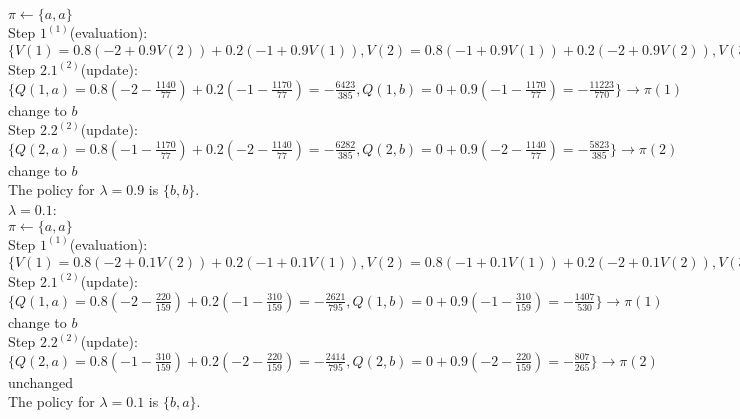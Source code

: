 \documentclass[11pt]{article}
\begin{document}
\begin{onehalfspace}
\begin{itemize}
$\pi \leftarrow \{a, a\}$\\
Step $1^{(1)}$(evaluation): $\{V(1) = 0.8(-2+0.9V(2)) + 0.2(-1+0.9V(1)), V(2) = 0.8(-1+0.9V(1))+0.2(-2+0.9V(2)), V(3) = 0\} \rightarrow \{V(1) = -\frac{1170}{77}, V(2) = -\frac{1140}{77}\}$\\
Step $2.1^{(2)}$(update): $\{Q(1, a) = 0.8(-2 - \frac{1140}{77}) + 0.2(-1 - \frac{1170}{77}) = -\frac{6423}{385}, Q(1,b) = 0 + 0.9(-1-\frac{1170}{77}) = -\frac{11223}{770}\} \rightarrow \pi(1)$ change to $b$\\
Step $2.2^{(2)}$(update): $\{Q(2, a) = 0.8(-1 - \frac{1170}{77}) + 0.2(-2 - \frac{1140}{77}) = -\frac{6282}{385}, Q(2, b) = 0 + 0.9(-2-\frac{1140}{77})=-\frac{5823}{385}\} \rightarrow \pi(2)$ change to $b$\\
The policy for $\lambda = 0.9$ is $\{b,b\}$.
\\
$\lambda = 0.1$:\\
$\pi \leftarrow \{a, a\}$\\
Step $1^{(1)}$(evaluation): $\{V(1) = 0.8(-2+0.1V(2)) + 0.2(-1+0.1V(1)), V(2) = 0.8(-1+0.1V(1))+0.2(-2+0.1V(2)), V(3) = 0\} \rightarrow \{V(1) = -\frac{310}{159}, V(2) = -\frac{220}{159}\}$\\
Step $2.1^{(2)}$(update): $\{Q(1, a) = 0.8(-2 - \frac{220}{159}) + 0.2(-1 - \frac{310}{159}) = -\frac{2621}{795}, Q(1,b) = 0 + 0.9(-1-\frac{310}{159}) = -\frac{1407}{530}\} \rightarrow \pi(1)$ change to $b$\\
Step $2.2^{(2)}$(update): $\{Q(2, a) = 0.8(-1 - \frac{310}{159}) + 0.2(-2 - \frac{220}{159}) = -\frac{2414}{795}, Q(2, b) = 0 + 0.9(-2-\frac{220}{159})=-\frac{807}{265}\} \rightarrow \pi(2)$ unchanged\\
The policy for $\lambda = 0.1$ is $\{b,a\}$.
\end{itemize}
\end{onehalfspace}
\end{document}
